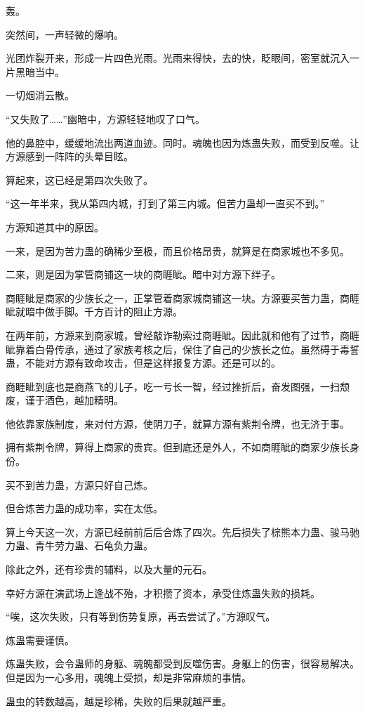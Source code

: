 \begin{this_body}
轰。

突然间，一声轻微的爆响。

光团炸裂开来，形成一片四色光雨。光雨来得快，去的快，眨眼间，密室就沉入一片黑暗当中。

一切烟消云散。

“又失败了……”幽暗中，方源轻轻地叹了口气。

他的鼻腔中，缓缓地流出两道血迹。同时。魂魄也因为炼蛊失败，而受到反噬。让方源感到一阵阵的头晕目眩。

算起来，这已经是第四次失败了。

“这一年半来，我从第四内城，打到了第三内城。但苦力蛊却一直买不到。”

方源知道其中的原因。

一来，是因为苦力蛊的确稀少至极，而且价格昂贵，就算是在商家城也不多见。

二来，则是因为掌管商铺这一块的商睚眦。暗中对方源下绊子。

商睚眦是商家的少族长之一，正掌管着商家城商铺这一块。方源要买苦力蛊，商睚眦就暗中做手脚。千方百计的阻止方源。

在两年前，方源来到商家城，曾经敲诈勒索过商睚眦。因此就和他有了过节，商睚眦靠着白骨传承，通过了家族考核之后，保住了自己的少族长之位。虽然碍于毒誓蛊，不能对方源有致命攻击，但是这样报复方源。还是可以的。

商睚眦到底也是商燕飞的儿子，吃一亏长一智，经过挫折后，奋发图强，一扫颓废，谨于酒色，越加精明。

他依靠家族制度，来对付方源，使阴刀子，就算方源有紫荆令牌，也无济于事。

拥有紫荆令牌，算得上商家的贵宾。但到底还是外人，不如商睚眦的商家少族长身份。

买不到苦力蛊，方源只好自己炼。

但合炼苦力蛊的成功率，实在太低。

算上今天这一次，方源已经前前后后合炼了四次。先后损失了棕熊本力蛊、骏马驰力蛊、青牛劳力蛊、石龟负力蛊。

除此之外，还有珍贵的辅料，以及大量的元石。

幸好方源在演武场上逢战不殆，才积攒了资本，承受住炼蛊失败的损耗。

“唉，这次失败，只有等到伤势复原，再去尝试了。”方源叹气。

炼蛊需要谨慎。

炼蛊失败，会令蛊师的身躯、魂魄都受到反噬伤害。身躯上的伤害，很容易解决。但是因为一心多用，魂魄上受损，却是非常麻烦的事情。

蛊虫的转数越高，越是珍稀，失败的后果就越严重。


\end{this_body}
